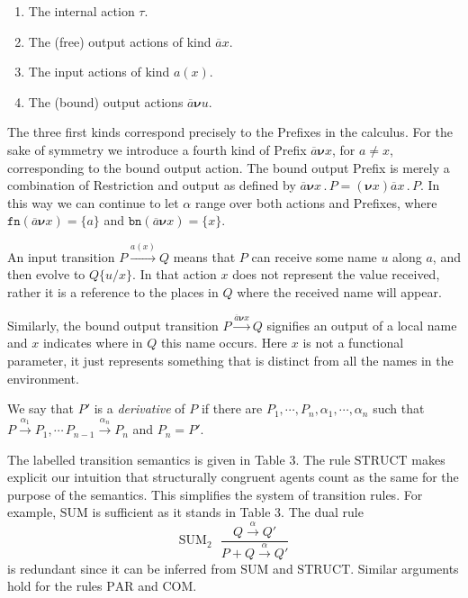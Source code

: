 \documentclass[10pt,a4paper]{article}
\newcommand{\resp}[1]{(\boldsymbol{\nu}#1)}
\newcommand{\res}[2]{\resp{#1}#2}
\newcommand{\outp}[2]{\overline{#1}#2}
\newcommand{\inpp}[2]{#1(#2)}
\newcommand{\silp}{\tau}
\newcommand{\prefix}[2]{{#1}\,.\,#2}
\newcommand{\boutp}[2]{\overline{#1}\boldsymbol{\nu}#2}
\newcommand{\out}[3]{\prefix{\outp{#1}{#2}}{#3}}
\newcommand{\bout}[3]{\prefix{\boutp{#1}{#2}}{#3}}
\newcommand{\fn}{\texttt{fn}}
\newcommand{\bn}{\texttt{bn}}
\newcommand{\tran}[3]{#1 \overset{#2}{\longrightarrow} #3}
\newcommand{\rulname}[1]{\scriptstyle \text{#1}}
\newcommand{\rul}[3]{\rulname{#1} \:\:\: \displaystyle \frac{#2}{#3}}
\begin{document}
\begin{enumerate}

\item The internal action $\silp$.

\item The (free) output actions of kind $\outp{a}{x}$.

\item The input actions of kind $\inpp{a}{x}$.

\item The (bound) output actions $\boutp{a}{u}$.
  
\end{enumerate}

The three first kinds correspond precisely to the Prefixes in the calculus. For the sake of symmetry we introduce a fourth kind of Prefix $\boutp{a}{x}$, for $a \neq x$, corresponding to the bound output action. The bound output Prefix is merely a combination of Restriction and output as defined by $\bout{a}{x}{P} = \res{x}{\out{a}{x}{P}}$. In this way we can continue to let $\alpha$ range over both actions and Prefixes, where $\fn(\boutp{a}{x}) = \{a\}$ and $\bn(\boutp{a}{x}) = \{x\}$.

An input transition $\tran{P}{\inpp{a}{x}}{Q}$ means that $P$ can receive some name $u$ along $a$, and then evolve to $Q\{u/x\}$. In that action $x$ does not represent the value received, rather it is a reference to the places in $Q$ where the received name will appear.

Similarly, the bound output transition $\tran{P}{\boutp{a}{x}}{Q}$ signifies an output of a local name and $x$ indicates where in $Q$ this name occurs. Here $x$ is not a functional parameter, it just represents something that is distinct from all the names in the environment.

We say that $P'$ is a \emph{derivative} of $P$ if there are $P_1,\cdots,P_n,\alpha_1,\cdots,\alpha_n$ such that $\tran{P}{\alpha_1}{P_1}, \cdots\, \tran{P_{n-1}}{\alpha_n}{P_n}$ and $P_n = P'$. 

The labelled transition semantics is given in Table 3. The rule $\rulname{STRUCT}$ makes explicit our intuition that structurally congruent agents count as the same for the purpose of the semantics. This simplifies the system of transition rules. For example, $\rulname{SUM}$ is sufficient as it stands in Table 3. The dual rule
\[
\rul{SUM$_2$}{\tran{Q}{\alpha}{Q'}}{\tran{P + Q}{\alpha}{Q'}}
\]
is redundant since it can be inferred from $\rulname{SUM}$ and $\rulname{STRUCT}$. Similar arguments hold for the rules $\rulname{PAR}$ and $\rulname{COM}$.
\end{document}
